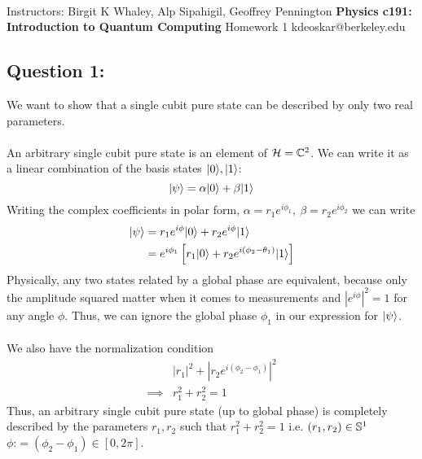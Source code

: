 \documentclass[11pt]{article}
\begin{document}
\thispagestyle{empty}
\bigskip \
\vspace{0.1cm}

\begin{center}
{\fontsize{14}{14} \selectfont Instructors: Birgit K Whaley, Alp Sipahigil, Geoffrey Pennington}
\vskip 16pt
{\fontsize{30}{30} \selectfont \bf \sffamily Physics c191: Introduction to Quantum Computing}
\vskip 24pt
{\fontsize{14}{14} \selectfont \rmfamily Homework 1} 
\vskip 6pt
{\fontsize{14}{14} \selectfont \ttfamily kdeoskar@berkeley.edu} 
\vskip 24pt
\end{center}




\subsection*{Question 1:}
We want to show that a single cubit pure state can be described by only two real parameters. 
\\
\\
An arbitrary single cubit pure state is an element of $\mathcal{H} = \mathbb{C}^2$. We can write it as a linear combination of the basis states $\lvert0\rangle, \lvert1\rangle$:
$$ \lvert\psi\rangle = \alpha \lvert0\rangle + \beta \lvert1\rangle $$ Writing the complex coefficients in polar form, $ \alpha = r_1 e^{i\phi_1}, ~\beta = r_2 e^{i\phi_2} $ we can write 
\begin{align*}
  \lvert\psi\rangle &= r_1 e^{i\phi} \lvert0\rangle + r_2 e^{i\phi} \lvert1\rangle \\
  &= e^{i\phi_1} \left[ r_1 \lvert0\rangle + r_2 e^{i(\phi_2 - \theta_1)} \lvert1\rangle \right]
\end{align*} Physically, any two states related by a global phase are equivalent, because only the amplitude squared matter when it comes to measurements and $|e^{i\phi}|^2 = 1$ for any angle $\phi$. Thus, we can ignore the global phase $\phi_1$ in our expression for $\lvert\psi\rangle$.
\\
\\
We also have the normalization condition 
\begin{align*}
  &|r_1|^2 + |r_2 e^{i(\phi_2 - \phi_1)} |^2 \\
  \implies& r_1^2 + r_2^2 = 1
\end{align*} Thus, an arbitrary single cubit pure state (up to global phase) is completely described by the parameters $r_1, r_2$ such that $r_1^2 + r_2^2 = 1$ i.e. $(r_1, r_2) \in \mathbb{S}^1$ $\phi \text{:}= (\phi_2 - \phi_1) \in [0, 2\pi]$. 
\end{document}
